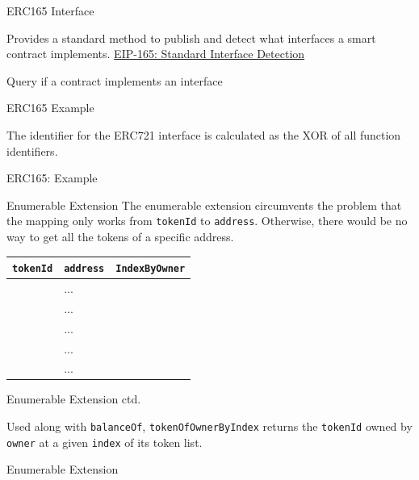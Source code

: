 \documentclass[handout]{beamer}
\begin{document}
\begin{frame}{ERC165 Interface}

Provides a standard method to publish and detect what interfaces a smart contract implements. \link \href{https://eips.ethereum.org/EIPS/eip-165}{EIP-165: Standard Interface Detection}
\vspace{1em}
	\begin{samplecode}{Query if a contract implements an interface}
			
	\end{samplecode}
\end{frame}


\begin{frame}{ERC165 Example}

The identifier for the ERC721 interface is calculated as the XOR of all function identifiers.
\vspace{0.5em}
\begin{samplecode}{ERC165: Example}
		
\end{samplecode}
\end{frame}

\begin{frame}{Enumerable Extension}
The enumerable extension circumvents the problem that the mapping only works from \texttt{tokenId} to \texttt{address}. Otherwise, there would be no way to get all the tokens of a specific address.
\vspace{0.5em}
		\begin{table}
			\begin{tabular}{clc}
			\hline \hline
			\texttt{tokenId} & \texttt{address} & \texttt{IndexByOwner}\\
			\hline
			\color{focus}{0} & \color{focus}{0x0901}... & \color{focus}{0} \\
			\color{mint}{1} & \color{mint}{0x7A25}... & \color{mint}{0} \\
			\color{focus}{2} & \color{focus}{0x0901}... & \color{focus}{1}\\
			\color{focus}{3} & \color{focus}{0x0901}... & \color{focus}{2}\\
			\color{darkmint}{4} & \color{darkmint}{0xce9b}... & \color{darkmint}{0} \\
			\hline \hline
			\end{tabular}
		\end{table}
\end{frame}

\begin{frame}{Enumerable Extension ctd.}

	Used along with \texttt{balanceOf}, \texttt{tokenOfOwnerByIndex} returns the \texttt{tokenId} owned by \texttt{owner} at a given \texttt{index} of its token list.\vspace{0.5em}
 
	\begin{samplecode}{Enumerable Extension}
		
	\end{samplecode}
\end{frame}
\end{document}
